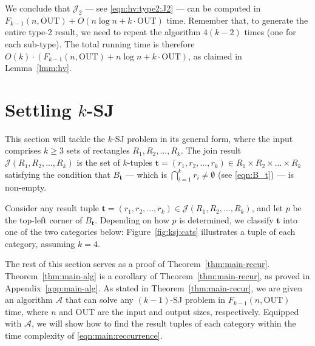 \documentclass[sigconf]{acmart}
\def\vgap{\vspace{0mm}}
\def\A{\mathcal{A}}
\def\J{\mathcal{J}}
\def\out{\mathrm{OUT}}
\begin{document}
{{{\vgap 

We conclude that $\J_2$ --- see \eqref{eqn:hv:type2:J2} --- can be computed in $F_{k-1}(n, \out) + O(n \log n +  k \cdot \out)$ time. Remember that, to generate the entire type-2 result, we need to repeat the algorithm $4(k-2)$ times (one for each sub-type). The total running time is therefore $O(k) \cdot (F_{k-1}(n, \out) + n \log n +  k \cdot \out)$, as claimed in Lemma~\ref{lmm:hv}.


\section{Settling $k$-SJ} \label{sec:ksj}

This section will tackle the $k$-SJ problem in its general form, where the input comprises $k \ge 3$ sets of rectangles $R_1, R_2, ..., R_k$. The join result $\J(R_1, R_2, ..., R_k)$ is the set of $k$-tuples $\bm{t} = (r_1, r_2, ..., r_k) \in R_1 \times R_2 \times ... \times R_k$ satisfying the condition that $B_\bm{t}$ --- which is $\bigcap_{i=1}^k r_i \ne \emptyset$ (see \eqref{eqn:B_t}) --- is non-empty.

\vgap 

Consider any result tuple $\bm{t} = (r_1, r_2, ..., r_k) \in \J(R_1, R_2, ..., R_k)$, and let $p$ be the top-left corner of $B_\bm{t}$. Depending on how $p$ is determined, we classify $\bm{t}$ into one of the two categories below: 
Figure~\ref{fig:ksj:cats} illustrates a tuple of each category, assuming $k=4$. 

\vgap

The rest of this section serves as a proof of Theorem~\ref{thm:main-recur}. Theorem~\ref{thm:main-alg} is a corollary of Theorem~\ref{thm:main-recur}, as proved in Appendix~\ref{app:main-alg}. As stated in Theorem~\ref{thm:main-recur}, we are given an algorithm $\A$ that can solve any $(k-1)$-SJ problem in $F_{k-1}(n, \out)$ time, where $n$ and $\out$ are the input and output sizes, respectively. Equipped with $\A$, we will show how to find the result tuples of each category within the time complexity of \eqref{eqn:main:reccurrence}.

}}}
\end{document}
